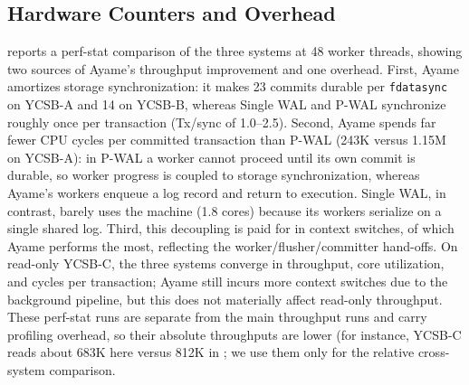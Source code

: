 \subsection{Hardware Counters and Overhead}
\label{sec:overhead}

 reports a perf-stat comparison of the three
systems at 48 worker threads, showing two sources of Ayame's throughput
improvement and one overhead.
First, Ayame amortizes storage synchronization: it makes 23 commits durable per
\texttt{fdatasync} on YCSB-A and 14 on YCSB-B, whereas Single WAL and P-WAL
synchronize roughly once per transaction (Tx/sync of 1.0--2.5).  Second, Ayame
spends far fewer CPU cycles per committed transaction than P-WAL (243K versus
1.15M on YCSB-A): in P-WAL a worker cannot proceed until its own commit is
durable, so worker progress is coupled to storage synchronization, whereas
Ayame's workers enqueue a log record and return to execution.  Single WAL, in
contrast, barely uses the machine (1.8 cores) because its workers serialize on
a single shared log.  Third, this decoupling is
paid for in context switches, of which Ayame performs the most, reflecting the
worker/flusher/committer hand-offs.  On read-only YCSB-C, the three systems
converge in throughput, core utilization, and cycles per transaction; Ayame
still incurs more context switches due to the background pipeline, but this does
not materially affect read-only throughput.  These perf-stat runs are separate from
the main throughput runs and carry profiling overhead, so their absolute
throughputs are lower (for instance, YCSB-C reads about 683K here versus 812K
in ; we use them only for the relative
cross-system comparison.

